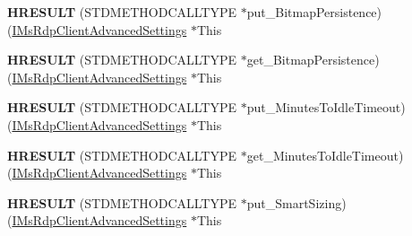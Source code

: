 \begin{DoxyCompactItemize}
\item 
\mbox{\label{struct_m_s_t_s_c_lib_1_1_i_ms_rdp_client_advanced_settings_vtbl_a90a198fc25ba75ba060946090ccf79f0}} 
{\bfseries H\+R\+E\+S\+U\+LT} (S\+T\+D\+M\+E\+T\+H\+O\+D\+C\+A\+L\+L\+T\+Y\+PE $\ast$put\+\_\+\+Bitmap\+Persistence)(\hyperlink{interface_m_s_t_s_c_lib_1_1_i_ms_rdp_client_advanced_settings}{I\+Ms\+Rdp\+Client\+Advanced\+Settings} $\ast$This
\item 
\mbox{\label{struct_m_s_t_s_c_lib_1_1_i_ms_rdp_client_advanced_settings_vtbl_a7b74f88f16073de7e78670928e14a4c1}} 
{\bfseries H\+R\+E\+S\+U\+LT} (S\+T\+D\+M\+E\+T\+H\+O\+D\+C\+A\+L\+L\+T\+Y\+PE $\ast$get\+\_\+\+Bitmap\+Persistence)(\hyperlink{interface_m_s_t_s_c_lib_1_1_i_ms_rdp_client_advanced_settings}{I\+Ms\+Rdp\+Client\+Advanced\+Settings} $\ast$This
\item 
\mbox{\label{struct_m_s_t_s_c_lib_1_1_i_ms_rdp_client_advanced_settings_vtbl_a3f504ef7522d36159e20d47e49a171cb}} 
{\bfseries H\+R\+E\+S\+U\+LT} (S\+T\+D\+M\+E\+T\+H\+O\+D\+C\+A\+L\+L\+T\+Y\+PE $\ast$put\+\_\+\+Minutes\+To\+Idle\+Timeout)(\hyperlink{interface_m_s_t_s_c_lib_1_1_i_ms_rdp_client_advanced_settings}{I\+Ms\+Rdp\+Client\+Advanced\+Settings} $\ast$This
\item 
\mbox{\label{struct_m_s_t_s_c_lib_1_1_i_ms_rdp_client_advanced_settings_vtbl_a9dd6fd0d41c6039ef55fd3ef5646eb5a}} 
{\bfseries H\+R\+E\+S\+U\+LT} (S\+T\+D\+M\+E\+T\+H\+O\+D\+C\+A\+L\+L\+T\+Y\+PE $\ast$get\+\_\+\+Minutes\+To\+Idle\+Timeout)(\hyperlink{interface_m_s_t_s_c_lib_1_1_i_ms_rdp_client_advanced_settings}{I\+Ms\+Rdp\+Client\+Advanced\+Settings} $\ast$This
\item 
\mbox{\label{struct_m_s_t_s_c_lib_1_1_i_ms_rdp_client_advanced_settings_vtbl_a1670e46bdd44b7768d8f14b9ea0d3b8d}} 
{\bfseries H\+R\+E\+S\+U\+LT} (S\+T\+D\+M\+E\+T\+H\+O\+D\+C\+A\+L\+L\+T\+Y\+PE $\ast$put\+\_\+\+Smart\+Sizing)(\hyperlink{interface_m_s_t_s_c_lib_1_1_i_ms_rdp_client_advanced_settings}{I\+Ms\+Rdp\+Client\+Advanced\+Settings} $\ast$This
\item 

\end{DoxyCompactItemize}
